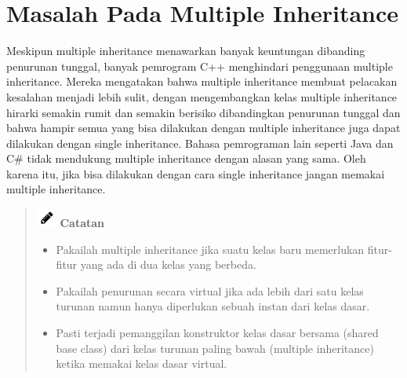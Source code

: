 \section{Masalah Pada Multiple Inheritance}\label{masalah-pada-multiple-inheritance}

Meskipun multiple inheritance menawarkan banyak keuntungan dibanding
penurunan tunggal, banyak pemrogram C++ menghindari penggunaan multiple
inheritance. Mereka mengatakan bahwa multiple inheritance membuat
pelacakan kesalahan menjadi lebih sulit, dengan mengembangkan kelas
multiple inheritance hirarki semakin rumit dan semakin berisiko
dibandingkan penurunan tunggal dan bahwa hampir semua yang bisa
dilakukan dengan multiple inheritance juga dapat dilakukan dengan single
inheritance. Bahasa pemrograman lain seperti Java dan C\# tidak
mendukung multiple inheritance dengan alasan yang sama. Oleh karena itu,
jika bisa dilakukan dengan cara single inheritance jangan memakai
multiple inheritance.

\begin{quotation}
\includegraphics{../manuscript/images/pencil}	\textbf{Catatan}
	\begin{itemize}
		\item Pakailah multiple inheritance jika suatu kelas baru memerlukan
		fitur-fitur yang ada di dua kelas yang berbeda.
		\item Pakailah penurunan secara virtual jika ada lebih dari satu kelas turunan
		namun hanya diperlukan sebuah instan dari kelas dasar.
		\item Pasti terjadi pemanggilan konstruktor kelas dasar bersama (shared base
		class) dari kelas turunan paling bawah (multiple inheritance) ketika
		memakai kelas dasar virtual.
	\end{itemize}
\end{quotation}
 


